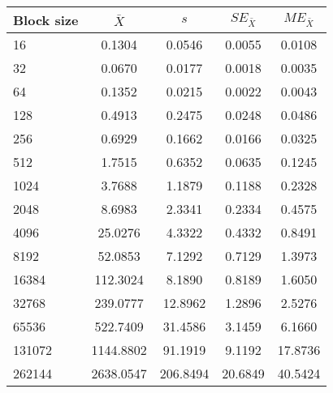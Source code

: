 \begin{tabular}{lcccc}\toprule
{\small Block size} & $\bar{X}$ & $s$ & $SE_{\bar{X}}$ & $ME_{\bar{X}}$ \\\midrule
16 & 0.1304 & 0.0546 & 0.0055 & 0.0108\\
32 & 0.0670 & 0.0177 & 0.0018 & 0.0035\\
64 & 0.1352 & 0.0215 & 0.0022 & 0.0043\\
128 & 0.4913 & 0.2475 & 0.0248 & 0.0486\\
256 & 0.6929 & 0.1662 & 0.0166 & 0.0325\\
512 & 1.7515 & 0.6352 & 0.0635 & 0.1245\\
1024 & 3.7688 & 1.1879 & 0.1188 & 0.2328\\
2048 & 8.6983 & 2.3341 & 0.2334 & 0.4575\\
4096 & 25.0276 & 4.3322 & 0.4332 & 0.8491\\
8192 & 52.0853 & 7.1292 & 0.7129 & 1.3973\\
16384 & 112.3024 & 8.1890 & 0.8189 & 1.6050\\
32768 & 239.0777 & 12.8962 & 1.2896 & 2.5276\\
65536 & 522.7409 & 31.4586 & 3.1459 & 6.1660\\
131072 & 1144.8802 & 91.1919 & 9.1192 & 17.8736\\
262144 & 2638.0547 & 206.8494 & 20.6849 & 40.5424\\
\bottomrule
\end{tabular}
